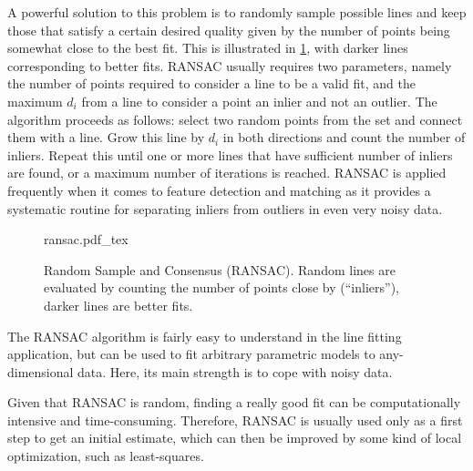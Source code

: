 A powerful solution to this problem is to randomly sample possible lines and keep those that satisfy a certain desired quality given by the number of points being somewhat close to the best fit. This is illustrated in \cref{fig:ransac}, with darker lines corresponding to better fits. RANSAC usually requires two parameters, namely the number of points required to consider a line to be a valid fit, and the maximum $d_i$ from a line to consider a point an inlier and not an outlier. The algorithm proceeds as follows: select two random points from the set and connect them with a line. Grow this line by $d_i$ in both directions and count the number of inliers. Repeat this until one or more lines that have sufficient number of inliers are found, or a maximum number of iterations is reached. RANSAC is applied frequently when it comes to feature detection and matching as it provides a systematic routine for separating inliers from outliers in even very noisy data.

\begin{figure}
    \center
    \def\svgwidth{0.6\textwidth}
    {ransac.pdf_tex}
    \caption{Random Sample and Consensus (RANSAC). Random lines are evaluated by counting the number of points close by (``inliers''), darker lines are better fits.\label{fig:ransac}}
\end{figure}

The RANSAC algorithm is fairly easy to understand in the line fitting application, but can be used to fit arbitrary parametric models to any-dimensional data. Here, its main strength is to cope with noisy data.

Given that RANSAC is random, finding a really good fit can be computationally intensive and time-consuming. Therefore, RANSAC is usually used only as a first step to get an initial estimate, which can then be improved by some kind of local optimization, such as least-squares.

